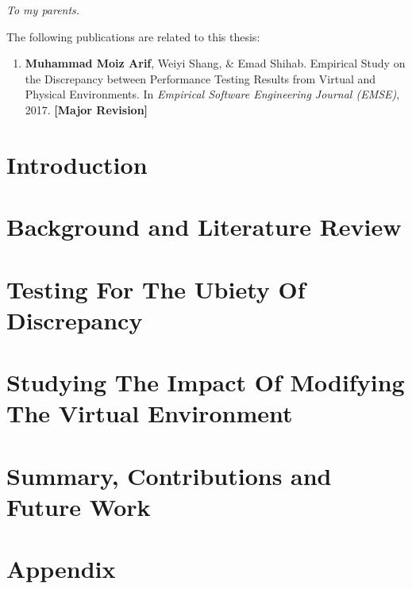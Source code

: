 \documentclass[12pt]{report}
\begin{document}
\begin{dedication}
	\begin{flushright}
		\textit{To my parents.}
	\end{flushright}

	
\end{dedication}

\begin{publications}

The following publications are related to this thesis:

\begin{enumerate}

\item {\textbf{Muhammad Moiz Arif}, Weiyi Shang, \& Emad Shihab. Empirical Study on the Discrepancy between Performance Testing Results from Virtual and Physical Environments. In \textit{Empirical Software Engineering Journal (EMSE)}, 2017. \textbf{[Major Revision]}} 

\end{enumerate}

\end{publications}

\chapter{Introduction}
\label{introduction}


\chapter{Background and Literature Review}
\label{background_and_literature_review}


\chapter{Testing For The Ubiety Of Discrepancy}
\label{chapter3}


\chapter{Studying The Impact Of Modifying The Virtual Environment}
\label{chapter4}


\chapter{Summary, Contributions and Future Work}
\label{conclusion}


\chapter{Appendix}
\label{appendix}


  

\end{document}
